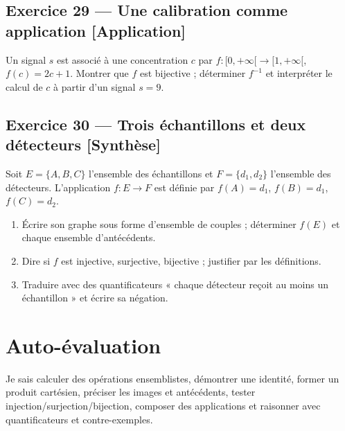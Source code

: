 \documentclass[11pt,a4paper,oneside]{article}
\newcommand{\exo}[3]{%
  \Needspace{6\baselineskip}%
  \subsection*{Exercice #1 --- #3 \hfill
  {\normalfont\footnotesize\color{GrisTexte}[#2]}}}
\begin{document}
\exo{29}{Application}{Une calibration comme application}
Un signal $s$ est associé à une concentration $c$ par
$f:[0,+\infty[\to[1,+\infty[$, $f(c)=2c+1$.
Montrer que $f$ est bijective ; déterminer $f^{-1}$ et interpréter le calcul de $c$ à partir d'un signal $s=9$.

\exo{30}{Synthèse}{Trois échantillons et deux détecteurs}
Soit $E=\{A,B,C\}$ l'ensemble des échantillons et $F=\{d_1,d_2\}$ l'ensemble des détecteurs.
L'application $f:E\to F$ est définie par
$f(A)=d_1$, $f(B)=d_1$, $f(C)=d_2$.
\begin{enumerate}
\item Écrire son graphe sous forme d'ensemble de couples ; déterminer $f(E)$ et chaque ensemble d'antécédents.
\item Dire si $f$ est injective, surjective, bijective ; justifier par les définitions.
\item Traduire avec des quantificateurs « chaque détecteur reçoit au moins un échantillon » et écrire sa négation.
\end{enumerate}

\section*{Auto-évaluation}
\begin{objectifbox}
Je sais calculer des opérations ensemblistes, démontrer une identité, former un produit cartésien, préciser les images et antécédents, tester injection/surjection/bijection, composer des applications et raisonner avec quantificateurs et contre-exemples.
\end{objectifbox}
\end{document}
